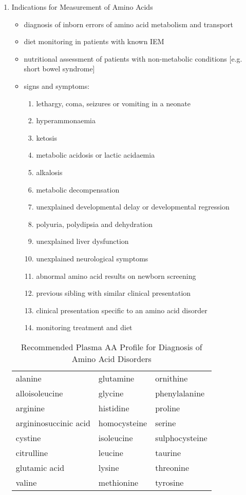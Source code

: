 \documentclass{scrartcl}
\begin{document}
\begin{enumerate}
\item Indications for Measurement of Amino Acids
\label{sec:org7d44b1d}
\begin{itemize}
\item diagnosis of inborn errors of amino acid metabolism and transport
\item diet monitoring in patients with known IEM
\item nutritional assessment of patients with non-metabolic conditions [e.g. short bowel syndrome]
\item signs and symptoms:
\begin{enumerate}
\item lethargy, coma, seizures or vomiting in a neonate
\item hyperammonaemia
\item ketosis
\item metabolic acidosis or lactic acidaemia
\item alkalosis
\item metabolic decompensation
\item unexplained developmental delay or developmental regression
\item polyuria, polydipsia and dehydration
\item unexplained liver dysfunction
\item unexplained neurological symptoms
\item abnormal amino acid results on newborn screening
\item previous sibling with similar clinical presentation
\item clinical presentation specific to an amino acid disorder
\item monitoring treatment and diet
\end{enumerate}
\end{itemize}

\begin{table}[htbp]
\caption{\label{tab:orgf7ed98a}Recommended Plasma AA Profile for Diagnosis of Amino Acid Disorders}
\centering
\begin{tabular}{lll}
alanine & glutamine & ornithine\\
alloisoleucine & glycine & phenylalanine\\
arginine & histidine & proline\\
argininosuccinic acid & homocysteine \footnotemark & serine\\
cystine & isoleucine & sulphocysteine \footnotemark\\
citrulline & leucine & taurine\\
glutamic acid & lysine & threonine\\
valine & methionine & tyrosine\\
\end{tabular}
\end{table}


\end{enumerate}
\end{document}
